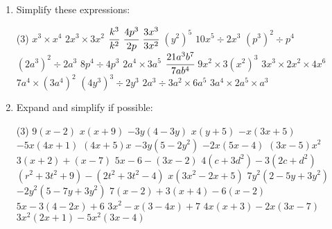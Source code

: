 \documentclass[fleqn]{article}
\begin{document}
\newpage
{}
\exercise{}
\begin{enumerate}
    \item Simplify these expressions:
        \vspace{-3mm}
        \begin{tasks}(3) %
            \task $x^3 \times x^4$                    %
            \task $2x^3 \times 3x^2$                  %
            \task $\cfrac{k^3}{k^2}$                  %
            \task $\cfrac{4p^3}{2p}$                  %
            \task $\cfrac{3x^3}{3x^2}$                %
            \task $(y^2)^5$                           %
            \task $10x^5 \div 2x^3$                   %
            \task $(p^3)^2 \div p^4$                  %
            \task $(2a^3)^2 \div 2a^3$                %
            \task $8p^4 \div 4p^3$                    %
            \task $2a^4 \times 3a^5$                  %
            \task $\cfrac{21a^3b^7}{7ab^4}$           %
            \task $9x^2 \times 3(x^2)^3$              %
            \task $3x^3 \times 2x^2 \times 4x^6$      %
            \task $7a^4 \times (3a^4)^2$              %
            \task $(4y^3)^3 \div 2y^3$                %
            \task $2a^3 \div 3a^2 \times 6a^5$        %
            \task $3a^4 \times 2a^5 \times a^3$       %
        \end{tasks}

    \vspace{4mm}
    \item Expand and simplify if possible:
        \begin{tasks}(3) %
            \task $9(x-2)$                            %
            \task $x(x+9)$                            %
            \task $-3y(4-3y)$                         %
            \task $x(y+5)$                            %
            \task $-x(3x+5)$                          %
            \task $-5x(4x+1)$                         %
            \task $(4x+5)x$                           %
            \task $-3y(5-2y^2)$                       %
            \task $-2x(5x-4)$                         %
            \task $(3x-5)x^2$                         %
            \task $3(x+2) + (x-7)$                    %
            \task $5x-6-(3x-2)$                       %
            \task $4(c+3d^2)-3(2c+d^2)$               %
            \task $(r^2+3t^2+9)-(2t^2+3t^2-4)$        %
            \task $x(3x^2-2x+5)$                      %
            \task $7y^2(2-5y+3y^2)$                   %
            \task $-2y^2(5-7y+3y^2)$                  %
            \task $7(x-2)+3(x+4)-6(x-2)$              %
            \task $5x-3(4-2x)+6$                      %
            \task $3x^2-x(3-4x)+7$                    %
            \task $4x(x+3)-2x(3x-7)$                  %
            \task $3x^2(2x+1)-5x^2(3x-4)$             %
        \end{tasks}


\end{enumerate}
\end{document}

